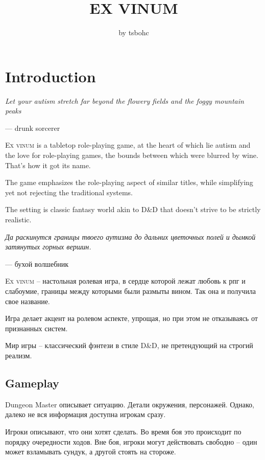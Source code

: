 \documentclass[a5paper,11pt]{book}
\title{\textbf{EX VINUM}}
\author{by tsbohc}
\date{}
\begin{document}
\maketitle
\thispagestyle{empty}
\enlargethispage{\baselineskip}
\tableofcontents
\pagebreak

\chapter{Introduction}
\begin{multicols}{2}

\begin{en}
\epigraph{\emph{Let your autism stretch far beyond the flowery fields and the foggy mountain peaks}}{--- drunk sorcerer}

\lettrine{E}{x vinum} is a tabletop role-playing game, at the heart of which lie autism and the love for role-playing games, the bounds between which were blurred by wine. That's how it got its name.

The game emphasizes the role-playing aspect of similar titles, while simplifying yet not rejecting the traditional systems.

The setting is classic fantasy world akin to D\&D that doesn't strive to be strictly realistic.
\end{en}

\begin{ru}
\epigraph{\emph{Да раскинутся границы твоего аутизма до дальних цветочных полей и дымкой затянутых горных вершин.}}{--- бухой волшебник}

\lettrine{E}{x vinum} -- настольная ролевая игра, в сердце которой лежат любовь к рпг и слабоумие, границы между которыми были размыты вином. Так она и получила свое название.

Игра делает акцент на ролевом аспекте, упрощая, но при этом не отказываясь от признанных систем.

Мир игры -- классический фэнтези в стиле D\&D, не претендующий на строгий реализм.
\end{ru}

\section{Gameplay}
\begin{ru}
Dungeon Master описывает ситуацию. Детали окружения, персонажей. Однако, далеко не вся информация доступна игрокам сразу.

Игроки описывают, что они хотят сделать. Во время боя это происходит по порядку очередности ходов. Вне боя, игроки могут действовать свободно -- один может взламывать сундук, а другой стоять на стороже.


\end{ru}
\end{multicols}
\end{document}
